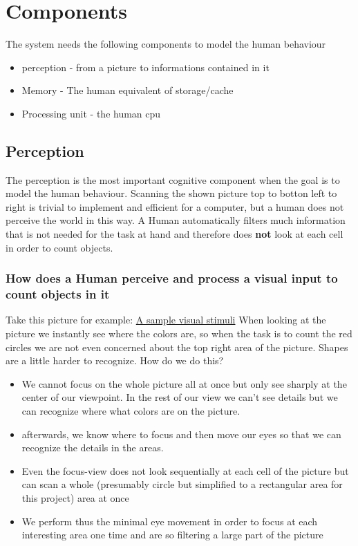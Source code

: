 \documentclass[11pt,a4paper,oneside]{scrartcl}
\begin{document}
\section{Components}
\label{sec-3}
The system needs the following components to model the human behaviour
\begin{itemize}
\item perception - from a picture to informations contained in it
\item Memory - The human equivalent of storage/cache
\item Processing unit - the human cpu
\end{itemize}

\subsection{Perception}
\label{sec-3-1}
The perception is the most important cognitive component when the
goal is to model the human behaviour.
Scanning the shown picture top to botton left to right is trivial
to implement and efficient for a computer, but a human does not
perceive the world in this way.
A Human automatically filters much information that is not needed
for the task at hand and therefore does \textbf{not} look at each cell in
order to count objects.

\subsubsection{How does a Human perceive and process a visual input to count objects in it}
\label{sec-3-1-1}
Take this picture for example:
\href{cosy.png}{A sample visual stimuli}
When looking at the picture we instantly see where the colors are,
so when the task is to count the red circles we are not even
concerned about the top right area of the picture. Shapes are a
little harder to recognize.
How do we do this? 
\begin{itemize}
\item We cannot focus on the whole picture all at once but only see
sharply at the center of our viewpoint. In the rest of our
view we can't see details but we can recognize where what colors
are on the picture.
\item afterwards, we know where to focus and then move our eyes so
that we can recognize the details in the areas.
\item Even the focus-view does not look sequentially at each cell of
the picture but can scan a whole (presumably circle but
simplified to a rectangular area for this project) area at once
\item We perform thus the minimal eye movement in order to focus at
each interesting area one time and are so filtering a large part
of the picture
\end{itemize}
\end{document}
